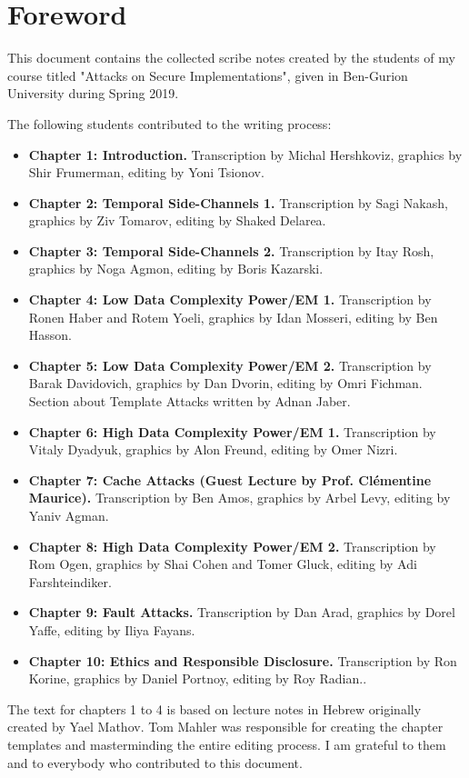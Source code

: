 \chapter*{Foreword} \label{chap:foreword}

This document contains the collected scribe notes created by the students of
my course titled "Attacks on Secure Implementations", given in
Ben-Gurion University during Spring 2019. 

The following students contributed to the writing process:
\begin{itemize}
    \item \textbf{Chapter 1: Introduction.}	Transcription by Michal Hershkoviz,
    graphics by	Shir Frumerman, editing by Yoni Tsionov.
    \item \textbf{Chapter 2: Temporal Side-Channels 1.}	Transcription by Sagi Nakash,
    graphics by	Ziv Tomarov, editing by Shaked Delarea.
    \item \textbf{Chapter 3: Temporal Side-Channels 2.}	Transcription by Itay Rosh,
    graphics by	Noga Agmon, editing by Boris Kazarski.
    \item \textbf{Chapter 4: Low Data Complexity Power/EM 1.}	Transcription by Ronen Haber
    and Rotem Yoeli, graphics by Idan Mosseri, editing by Ben Hasson.
    \item \textbf{Chapter 5: Low Data Complexity Power/EM 2.}	Transcription by Barak Davidovich,
    graphics by	Dan Dvorin, editing by Omri Fichman. Section about Template
    Attacks written by Adnan Jaber.
    \item \textbf{Chapter 6: High Data Complexity Power/EM 1.}	Transcription by Vitaly
    Dyadyuk, graphics by	Alon Freund, editing by Omer Nizri.
    \item \textbf{Chapter 7: Cache Attacks (Guest Lecture by Prof. Clémentine Maurice).}	Transcription by Ben Amos,
    graphics by	Arbel Levy, editing by Yaniv Agman.
    			
    \item \textbf{Chapter 8: High Data Complexity Power/EM 2.}	Transcription by Rom Ogen,
    graphics by	Shai Cohen and Tomer Gluck, editing by Adi Farshteindiker.
    \item \textbf{Chapter 9: Fault Attacks.}	Transcription by Dan Arad,
    graphics by	Dorel Yaffe, editing by Iliya Fayans.
    \item \textbf{Chapter 10: Ethics and Responsible Disclosure.}	Transcription by Ron Korine,
    graphics by	Daniel Portnoy, editing by Roy Radian..
\end{itemize}

The text for chapters 1 to 4 is based on lecture notes in Hebrew originally
created by Yael Mathov. Tom Mahler was responsible for creating the chapter
templates and masterminding the entire editing process. I am grateful to them
and to everybody who contributed to this document.
